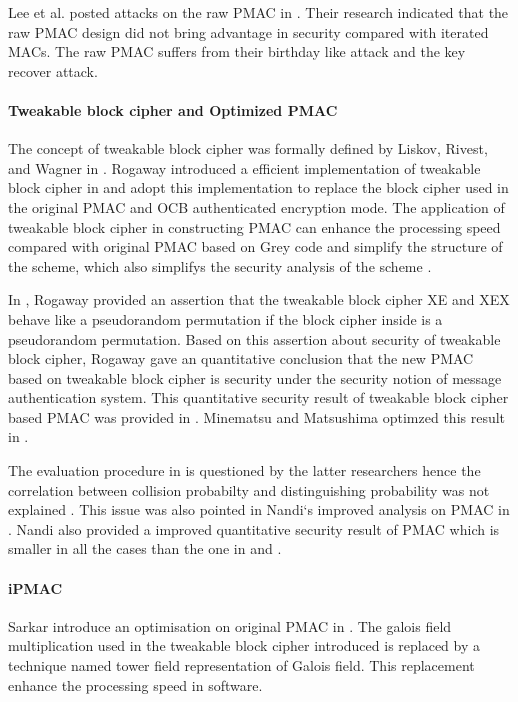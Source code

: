 \documentclass{article}
\begin{document}
Lee et al. posted attacks on the raw PMAC in \cite{pmac_forgery}. Their research indicated that the raw PMAC design did not bring advantage in security compared with iterated MACs. The raw PMAC suffers from their birthday like attack and the key recover attack.
 
\paragraph{Tweakable block cipher and Optimized PMAC}
The concept of tweakable block cipher was formally defined by Liskov, Rivest, and Wagner in \cite{tweak}. Rogaway introduced a efficient implementation of tweakable block cipher in \cite{tweak_pmac}and adopt this implementation to replace the block cipher used in the original PMAC and OCB authenticated encryption mode.
The application of tweakable block cipher in constructing PMAC can enhance the processing speed compared with original PMAC based on Grey code and simplify the structure of the scheme, which also simplifys the security analysis of the scheme . 

In \cite{tweak_pmac}, Rogaway provided an assertion that the tweakable block cipher XE and XEX behave like a pseudorandom permutation if the block cipher inside is a pseudorandom permutation. Based on this assertion about security of tweakable block cipher, Rogaway gave an quantitative conclusion that the new PMAC based on tweakable block cipher is security under the security notion of message authentication system. This quantitative security result of tweakable block cipher based PMAC was provided in \cite{tweak_pmac}.
Minematsu and Matsushima optimzed this result in \cite{new}. 

The evaluation procedure in \cite{pmac} is questioned by the latter researchers hence the correlation between collision probabilty and 
distinguishing probability was not explained . This issue was also pointed in Nandi`s improved analysis on PMAC in \cite{improve_pmac}. Nandi also provided a improved quantitative security result of PMAC which is smaller in all the cases than the one in \cite{pmac} and \cite{new}. 

\paragraph{iPMAC}
Sarkar introduce an optimisation on original PMAC in \cite{iPMAC}. The galois field multiplication used in the tweakable block cipher introduced is replaced by a technique named tower field representation of Galois field. This replacement enhance the processing speed in software.
\end{document}
